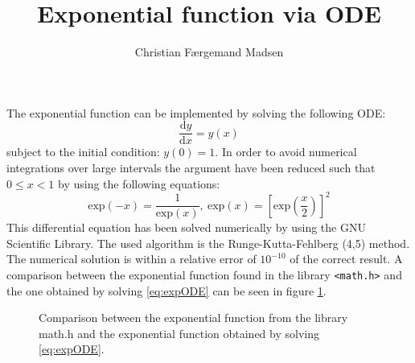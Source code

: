 \documentclass{article}
\begin{document}
\title{Exponential function via ODE}
\author{Christian Færgemand Madsen}
\date{}
\maketitle

\noindent The exponential function can be implemented by solving the following ODE:
\begin{equation}
\label{eq:expODE}
\frac{\mathrm{d} y}{\mathrm{d} x}=y(x)
\end{equation}
subject to the initial condition: $y(0)=1$. In order to avoid numerical integrations over large intervals the argument have been reduced such that $0 \leq x <1$ by using the following equations:
\begin{equation*}
\text{exp}(-x)=\frac{1}{\text{exp}(x)}, \ \text{exp}(x)=\left [ \text{exp}\left ( \frac{x}{2} \right ) \right ]^2
\end{equation*}
This differential equation has been solved numerically by using the GNU Scientific Library. The used algorithm is the Runge-Kutta-Fehlberg (4,5) method. The numerical solution is within a relative error of $10^{-10}$ of the correct result. A comparison between the exponential function found in the library \texttt{<math.h>} and the one obtained by solving \eqref{eq:expODE} can be seen in figure \ref{fig:expODEplot}.

\begin{figure}[h]
\centering

\caption{Comparison between the exponential function from the library math.h and the exponential function obtained by solving \eqref{eq:expODE}.}
\label{fig:expODEplot}
\end{figure}
\end{document}
